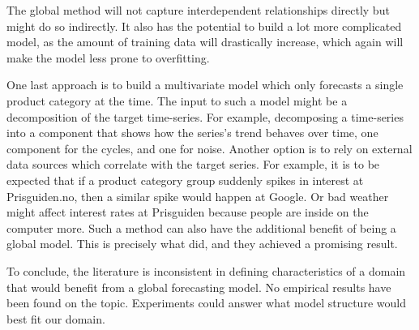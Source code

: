 The global method will not capture interdependent relationships directly
but might do so indirectly. It also has the potential to build a lot more complicated model,
as the amount of training data will drastically increase, which again will make the model less prone to
overfitting.

One last approach is to build a multivariate model which only forecasts a single product category at the time.
The input to such a model might be a decomposition of the target time-series.
For example, decomposing a time-series into a component that shows how the series's trend behaves over time,
one component for the cycles, and one for noise.
Another option is to rely on external data sources which correlate with the target series.
For example, it is to be expected that if a product category group suddenly spikes in interest at Prisguiden.no,
then a similar spike would happen at Google.
Or bad weather might affect interest rates at Prisguiden because people are inside on the computer more.
Such a method can also have the additional benefit of being a global model.
This is precisely what \cite{Laptev} did, and they achieved a promising result.

To conclude,
the literature is inconsistent in defining characteristics of a domain that would benefit from a global forecasting model.
No empirical results have been found on the topic. Experiments could answer what model structure would best fit our domain.


